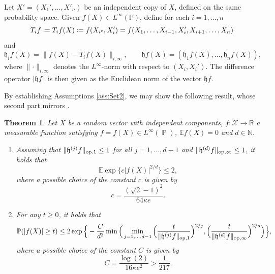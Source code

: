 \documentclass[a4paper,12pt]{amsart}
\numberwithin{equation}{section}
\newtheorem{satz}{Theorem}[section]
\theoremstyle{remark}
\DeclarePairedDelimiter	{\abs}		{\lvert}	{\rvert}
\DeclarePairedDelimiter	{\norm}		{\lVert}	{\rVert}
\DeclareMathOperator	{\IP}		{\mathbb{P}}
\def\E{{\mathbb E}}
\def\P{{\mathbb P}}
\def\R{{\mathbb R}}
\def\N{{\mathbb N}}
\begin{document}
Let $X' = (X_1',\ldots, X'_n)$ be an independent copy of $X$, defined on the same probability space. Given $f(X) \in L^\infty(\mathbb{P})$, define for each $i = 1, \ldots, n$
\begin{equation*}
	T_i f \coloneqq T_if(X) \coloneqq f(X_{i^c}, X_i') = f(X_1, \ldots, X_{i-1}, X_i',\linebreak[2] X_{i+1},\ldots, X_n)
\end{equation*}
and
\begin{equation}	\label{eq:Operatorh}
	\mathfrak{h}_i f(X) = \lVert f(X) - T_if(X) \rVert_{i, \infty},
	\qquad \mathfrak{h} f(X) = (\mathfrak{h}_1 f(X), \ldots, \mathfrak{h}_n f(X)),
\end{equation}
where $\lVert \cdot \rVert_{i, \infty}$ denotes the $L^\infty$-norm with respect to $(X_i,X_i')$. The difference operator $\abs{\mathfrak{h}f}$ is then given as the Euclidean norm of the vector $\mathfrak{h} f$.

By establishing Assumptions \ref{ass:Set2}, we may show the following result, whose second part mirrors \cite[Th.\ 1]{GSS21a}.

\begin{satz}\label{thm:HigherOrderIndep}
    Let $X$ be a random vector with independent components, $f: \mathcal{X} \to \R$ a measurable function satisfying $f = f(X) \in L^\infty(\IP)$, $\E f(X) = 0$ and $d \in \N$.
    \begin{enumerate}
        \item Assuming that $\norm{\mathfrak{h}^{(j)} f}_{\mathrm{op},1} \le 1$ for all $j=1,\ldots,d-1$ and $\norm{\mathfrak{h}^{(d)} f}_{\mathrm{op},\infty} \le 1$, it holds that
        \[
        \E \exp\Big\{c |f(X)|^{2/d} \Big\} \le 2,
        \]
        where a possible choice of the constant $c$ is given by
        \[
        c = \frac{(\sqrt{2}-1)^2}{64 \kappa e}.
        \]
        \item For any $t\ge 0$, it holds that
        \[
        \P(|f(X)| \ge t)\le
        2 \exp\Big\{- \frac{C}{d^2} \min\Big(\min_{j=1, \ldots,d-1} \Big(\frac{t}{\norm{\mathfrak{h}^{(j)} f}_{\mathrm{op},1}}\Big)^{2/j}, \Big(\frac{t}{\norm{\mathfrak{h}^{(d)} f}_{\mathrm{op},\infty}}\Big)^{2/d}\Big)\Big\},
        \]
    where a possible choice of the constant $C$ is given by
    \[
    C = \frac{\log(2)}{16 \kappa e^2} > \frac{1}{217}.
    \]
    \end{enumerate}
\end{satz}
\end{document}
